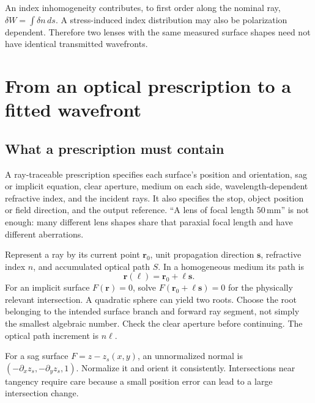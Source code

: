 An index inhomogeneity contributes, to first order along the nominal
ray, $\delta W=\int\delta n\,ds$. A stress-induced index distribution
may also be polarization dependent. Therefore two lenses with the
same measured surface shapes need not have identical transmitted
wavefronts.

\chapter{From an optical prescription to a fitted wavefront}
\label{zc:prescription}

\section{What a prescription must contain}
A ray-traceable prescription specifies each surface's position and
orientation, sag or implicit equation, clear aperture, medium on each
side, wavelength-dependent refractive index, and the incident rays.
It also specifies the stop, object position or field direction, and
the output reference. ``A lens of focal length $50\,\mathrm{mm}$'' is
not enough: many different lens shapes share that paraxial focal
length and have different aberrations.

Represent a ray by its current point $\bm r_0$, unit propagation
direction $\bm s$, refractive index $n$, and accumulated optical path
$S$. In a homogeneous medium its path is
\begin{equation}
 \bm r(\ell)=\bm r_0+\ell\bm s.
\end{equation}
For an implicit surface $F(\bm r)=0$, solve
$F(\bm r_0+\ell\bm s)=0$ for the physically relevant intersection.
A quadratic sphere can yield two roots. Choose the root belonging to
the intended surface branch and forward ray segment, not simply the
smallest algebraic number. Check the clear aperture before continuing.
The optical path increment is $n\ell$.

For a sag surface $F=z-z_s(x,y)$, an unnormalized normal is
$(-\partial_xz_s,-\partial_yz_s,1)$. Normalize it and orient it
consistently. Intersections near tangency require care because a small
position error can lead to a large intersection change.

